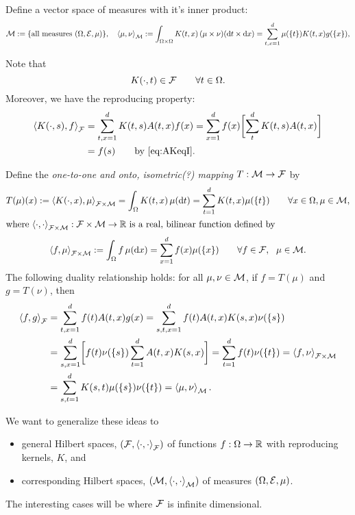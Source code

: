 \documentclass[reqno]{amsart}
\begin{document}
Define a vector space of measures with it's inner product:
\begin{equation*}
    \cm : = \{\text{all measures } (\Omega, \ce, \mu) \}, \quad 
    \ip[\cm]{\mu}{\nu} := \int_{\Omega \times \Omega} K(t,x) \, (\mu \times \nu) (\dif t \times \dif x) = \sum_{t,x=1}^d \mu(\{t\}) K(t,x) g(\{x\}),
\end{equation*}

Note that 
\[
K(\cdot,t) \in \cf \qquad \forall t \in \Omega.
\]
Moreover, we have the reproducing property:
\begin{align*}
\ip[\cf]{K(\cdot,s)}{f} &=  \sum_{t,x=1}^d K(t,s) A(t,x) f(x) 
= \sum_{x=1}^d f(x) \biggl[\sum_{t}^d K(t,s) A(t,x) \biggr] \\
& = f(s) \qquad \text{by \eqref{eq:AKeqI}}.
\end{align*}


Define the \emph{one-to-one and onto, isometric(?) mapping} $T : \cm \to \cf$ by 
\begin{gather*}
    T(\mu)(x) := \ip[\cf \times \cm]{K(\cdot, x)}{\mu} = \int_\Omega K(t, x) \, \mu(\dif t) = \sum_{t=1}^d K(t,x) \mu(\{t\}) \qquad \forall x \in \Omega, \mu \in \cm, \\
    \intertext{where $ \ip[\cf \times \cm]{\cdot}{\cdot} : \cf \times \cm \to \reals$ is a real, bilinear function defined by} 
    \ip[\cf \times \cm]{f}{\mu} := \int_\Omega f \, \mu(\dif x) = \sum_{x=1}^d f(x) \mu(\{x\}) \qquad \forall f \in \cf, \ \  \mu \in \cm.
\end{gather*}
The following duality relationship holds:  for all $\mu, \nu \in \cm$, if $f = T(\mu)$ and $g = T (\nu)$, then 
\begin{align*}
    \ip[\cf]{f}{g} 
    & = \sum_{t,x=1}^d f(t) A(t,x) g(x)
    = \sum_{s,t,x=1}^d f(t) A(t,x)  K(s,x) \nu(\{s\})  \\
    &
    = \sum_{s,x=1}^d \biggl [ f(t) \nu(\{s\}) \sum_{t=1}^d A(t,x)  K(s,x) \biggr]
    = \sum_{t=1}^d f(t) \nu(\{t\}) = \ip[\cf \times \cm]{f}{\nu} \\
    & = \sum_{s,t=1}^d K(s,t) \mu(\{s\}) \nu(\{t\}) =  \ip[\cm]{\mu}{\nu} .
\end{align*}

We want to generalize these ideas to 
\begin{itemize}
    \item general Hilbert spaces, $(\cf, \ip[\cf]{\cdot}{\cdot})$  of functions $f : \Omega \to \reals$ with reproducing kernels, $K$, and 
    \item corresponding Hilbert spaces, $(\cm, \ip[\cm]{\cdot}{\cdot})$  of measures $(\Omega, \ce, \mu)$.
\end{itemize}
The interesting cases will be where $\cf$ is infinite dimensional.
\end{document}
